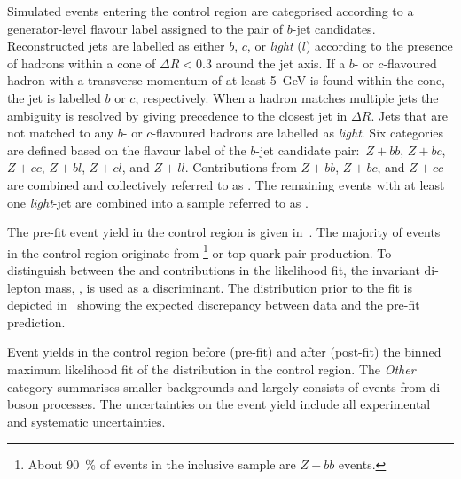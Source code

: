 Simulated \Zjets events entering the \ZHF control region are
categorised according to a generator-level flavour label assigned to
the pair of $b$-jet candidates. Reconstructed jets are labelled as
either $b$, $c$, or \emph{light} ($l$) according to the presence of
hadrons within a cone of $\Delta R < 0.3$ around the jet axis. If a
$b$- or $c$-flavoured hadron with a transverse momentum of at least
\SI{5}{\GeV} is found within the cone, the jet is labelled $b$ or $c$,
respectively. When a hadron matches multiple jets the ambiguity is
resolved by giving precedence to the closest jet in $\Delta R$. Jets
that are not matched to any $b$- or $c$-flavoured hadrons are labelled
as \emph{light}. Six categories are defined based on the flavour label
of the $b$-jet candidate pair:~$Z + bb$, $Z + bc$, $Z + cc$, $Z + bl$,
$Z + cl$, and $Z + ll$. Contributions from $Z + bb$, $Z + bc$, and
$Z + cc$ are combined and collectively referred to as \ZHF. The
remaining \Zjets events with at least one \emph{light}-jet are
combined into a sample referred to as \ZLF.


The pre-fit event yield in the \ZHF control region is given
in~. The majority of events in the control region
originate from \ZHF\footnote{About \SI{90}{\percent} of events in the
  inclusive \ZHF sample are $Z + bb$ events.} or top quark pair
production.
To distinguish between the \ZHF and \ttbar contributions in the
likelihood fit, the invariant di-lepton mass, \mll, is used as a
discriminant. The \mll distribution prior to the fit is depicted
in~ showing the expected discrepancy between
data and the pre-fit prediction.

\begin{table}[htbp]
  \centering

  \caption{Event yields in the \ZHF control region before (pre-fit)
    and after (post-fit) the binned maximum likelihood fit of the \mll
    distribution in the control region. The \emph{Other} category
    summarises smaller backgrounds and largely consists of events from
    di-boson processes. The uncertainties on the event yield include
    all experimental and systematic uncertainties.}%
  \label{tab:zcr_yields}

  
\end{table}

